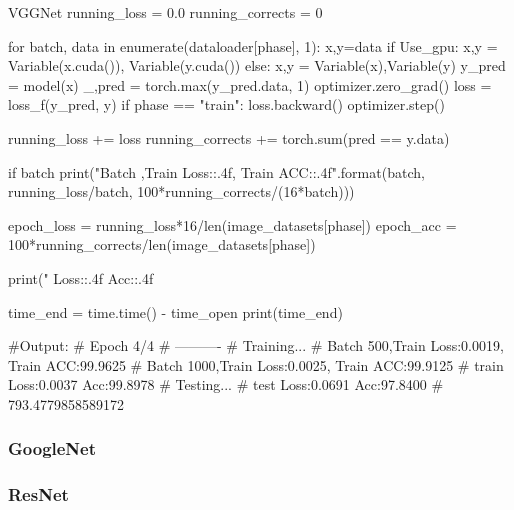 \documentclass[openbib]{article}
\begin{document}
\begin{Python}{VGGNet}
	running_loss = 0.0
	running_corrects = 0
	
	for batch, data in enumerate(dataloader[phase], 1):
		x,y=data
		if Use_gpu:
		x,y = Variable(x.cuda()), Variable(y.cuda())
	else:
		x,y = Variable(x),Variable(y)
		y_pred = model(x)
		_,pred = torch.max(y_pred.data, 1)
		optimizer.zero_grad()
		loss = loss_f(y_pred, y)
		if phase == "train":
			loss.backward()
			optimizer.step()
	
		running_loss += loss
		running_corrects += torch.sum(pred == y.data)
	
		if batch%
			print("Batch {},Train Loss:{:.4f}, Train ACC:{:.4f}".format(batch, running_loss/batch,
					100*running_corrects/(16*batch)))
					
epoch_loss = running_loss*16/len(image_datasets[phase])
epoch_acc = 100*running_corrects/len(image_datasets[phase])

print("{} Loss:{:.4f} Acc:{:.4f}%

time_end = time.time() - time_open
print(time_end)

#Output:
#		Epoch 4/4
#		----------
#		Training...
#		Batch 500,Train Loss:0.0019, Train ACC:99.9625
#		Batch 1000,Train Loss:0.0025, Train ACC:99.9125
#		train Loss:0.0037 Acc:99.8978%
#		Testing...
#		test Loss:0.0691 Acc:97.8400%
#		793.4779858589172

\end{Python}
\subsubsection{GoogleNet}

\subsubsection{ResNet}
\end{document}
